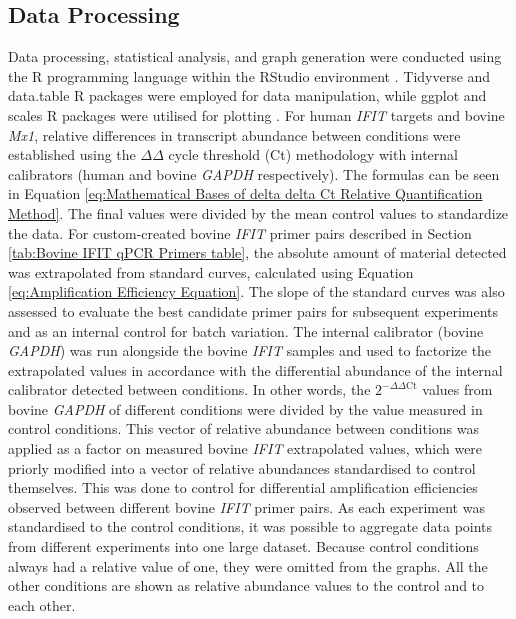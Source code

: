 \subsection{Data Processing} \label{subsec:Data Processing}
Data processing, statistical analysis, and graph generation were conducted using the R programming language \cite{RCoreTeam2022R:Computing} within the RStudio environment \cite{RStudioTeam2022RStudio:RStudio}. Tidyverse and data.table R packages \cite{Wickham2019WelcomeTidyverse, Dowle2022Data.table:data.frame} were employed for data manipulation, while ggplot and scales R packages were utilised for plotting \cite{Wickham2019WelcomeTidyverse, Wickham2022Scales:Visualization}. For human \textit{IFIT} targets and bovine \textit{Mx1}, relative differences in transcript abundance between conditions were established using the \(\Delta\)\(\Delta\) cycle threshold (Ct) methodology with internal calibrators (human and bovine \textit{GAPDH} respectively). The formulas can be seen in Equation \ref{eq:Mathematical Bases of delta delta Ct Relative Quantification Method}. The final values were divided by the mean control values to standardize the data. For custom-created bovine \textit{IFIT} primer pairs described in Section \ref{tab:Bovine IFIT qPCR Primers table}, the absolute amount of material detected was extrapolated from standard curves, calculated using Equation \ref{eq:Amplification Efficiency Equation}. The slope of the standard curves was also assessed to evaluate the best candidate primer pairs for subsequent experiments and as an internal control for batch variation. The internal calibrator (bovine \textit{GAPDH}) was run alongside the bovine \textit{IFIT} samples and used to factorize the extrapolated values in accordance with the differential abundance of the internal calibrator detected between conditions. In other words, the \(2^{-\Delta\Delta \mbox{Ct}}\) values from bovine \textit{GAPDH} of different conditions were divided by the value measured in control conditions. This vector of relative abundance between conditions was applied as a factor on measured bovine \textit{IFIT} extrapolated values, which were priorly modified into a vector of relative abundances standardised to control themselves. This was done to control for differential amplification efficiencies observed between different bovine \textit{IFIT} primer pairs. As each experiment was standardised to the control conditions, it was possible to aggregate data points from different experiments into one large dataset. Because control conditions always had a relative value of one, they were omitted from the graphs. All the other conditions are shown as relative abundance values to the control and to each other.

